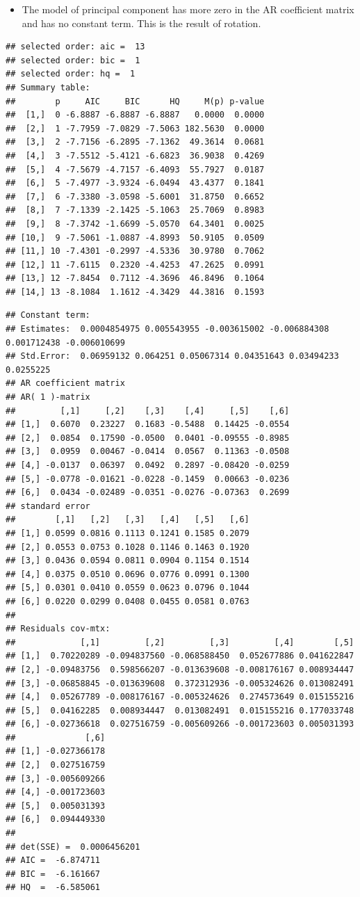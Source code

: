 \documentclass[]{article}
\providecommand{\tightlist}{%
  \setlength{\itemsep}{0pt}\setlength{\parskip}{0pt}}
\begin{document}
\begin{itemize}
\tightlist
\item
  The model of principal component has more zero in the AR coefficient
  matrix and has no constant term. This is the result of rotation.
\end{itemize}

\begin{verbatim}
## selected order: aic =  13 
## selected order: bic =  1 
## selected order: hq =  1 
## Summary table:  
##        p     AIC     BIC      HQ     M(p) p-value
##  [1,]  0 -6.8887 -6.8887 -6.8887   0.0000  0.0000
##  [2,]  1 -7.7959 -7.0829 -7.5063 182.5630  0.0000
##  [3,]  2 -7.7156 -6.2895 -7.1362  49.3614  0.0681
##  [4,]  3 -7.5512 -5.4121 -6.6823  36.9038  0.4269
##  [5,]  4 -7.5679 -4.7157 -6.4093  55.7927  0.0187
##  [6,]  5 -7.4977 -3.9324 -6.0494  43.4377  0.1841
##  [7,]  6 -7.3380 -3.0598 -5.6001  31.8750  0.6652
##  [8,]  7 -7.1339 -2.1425 -5.1063  25.7069  0.8983
##  [9,]  8 -7.3742 -1.6699 -5.0570  64.3401  0.0025
## [10,]  9 -7.5061 -1.0887 -4.8993  50.9105  0.0509
## [11,] 10 -7.4301 -0.2997 -4.5336  30.9780  0.7062
## [12,] 11 -7.6115  0.2320 -4.4253  47.2625  0.0991
## [13,] 12 -7.8454  0.7112 -4.3696  46.8496  0.1064
## [14,] 13 -8.1084  1.1612 -4.3429  44.3816  0.1593
\end{verbatim}

\begin{verbatim}
## Constant term: 
## Estimates:  0.0004854975 0.005543955 -0.003615002 -0.006884308 0.001712438 -0.006010699 
## Std.Error:  0.06959132 0.064251 0.05067314 0.04351643 0.03494233 0.0255225 
## AR coefficient matrix 
## AR( 1 )-matrix 
##         [,1]     [,2]    [,3]    [,4]     [,5]    [,6]
## [1,]  0.6070  0.23227  0.1683 -0.5488  0.14425 -0.0554
## [2,]  0.0854  0.17590 -0.0500  0.0401 -0.09555 -0.8985
## [3,]  0.0959  0.00467 -0.0414  0.0567  0.11363 -0.0508
## [4,] -0.0137  0.06397  0.0492  0.2897 -0.08420 -0.0259
## [5,] -0.0778 -0.01621 -0.0228 -0.1459  0.00663 -0.0236
## [6,]  0.0434 -0.02489 -0.0351 -0.0276 -0.07363  0.2699
## standard error 
##        [,1]   [,2]   [,3]   [,4]   [,5]   [,6]
## [1,] 0.0599 0.0816 0.1113 0.1241 0.1585 0.2079
## [2,] 0.0553 0.0753 0.1028 0.1146 0.1463 0.1920
## [3,] 0.0436 0.0594 0.0811 0.0904 0.1154 0.1514
## [4,] 0.0375 0.0510 0.0696 0.0776 0.0991 0.1300
## [5,] 0.0301 0.0410 0.0559 0.0623 0.0796 0.1044
## [6,] 0.0220 0.0299 0.0408 0.0455 0.0581 0.0763
##   
## Residuals cov-mtx: 
##             [,1]         [,2]         [,3]         [,4]        [,5]
## [1,]  0.70220289 -0.094837560 -0.068588450  0.052677886 0.041622847
## [2,] -0.09483756  0.598566207 -0.013639608 -0.008176167 0.008934447
## [3,] -0.06858845 -0.013639608  0.372312936 -0.005324626 0.013082491
## [4,]  0.05267789 -0.008176167 -0.005324626  0.274573649 0.015155216
## [5,]  0.04162285  0.008934447  0.013082491  0.015155216 0.177033748
## [6,] -0.02736618  0.027516759 -0.005609266 -0.001723603 0.005031393
##              [,6]
## [1,] -0.027366178
## [2,]  0.027516759
## [3,] -0.005609266
## [4,] -0.001723603
## [5,]  0.005031393
## [6,]  0.094449330
##   
## det(SSE) =  0.0006456201 
## AIC =  -6.874711 
## BIC =  -6.161667 
## HQ  =  -6.585061
\end{verbatim}
\end{document}
